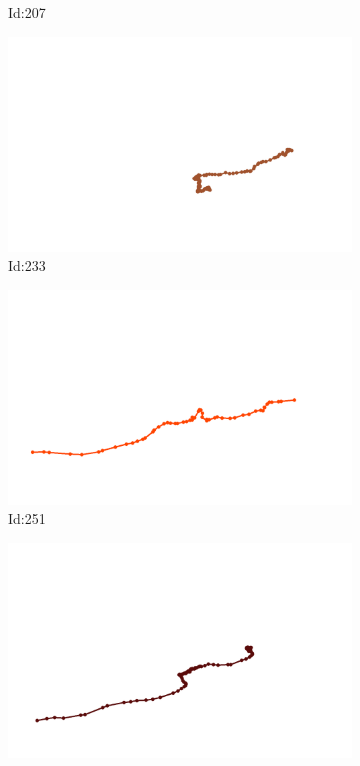 \documentclass[12pt,twoside]{report}
\begin{document}
\begin{figure}
\begin{subfigure}[b]{0.20\textwidth}
\caption{Id:207}
\end{subfigure}
\begin{subfigure}[b]{0.20\textwidth}
\centering
\includegraphics[width=\textwidth]{../trajectories/233.png}
\caption{Id:233}
\end{subfigure}
\begin{subfigure}[b]{0.20\textwidth}
\centering
\includegraphics[width=\textwidth]{../trajectories/251.png}
\caption{Id:251}
\end{subfigure}
\begin{subfigure}[b]{0.20\textwidth}
\centering
\includegraphics[width=\textwidth]{../trajectories/257.png}

\end{subfigure}
\end{figure}
\end{document}

